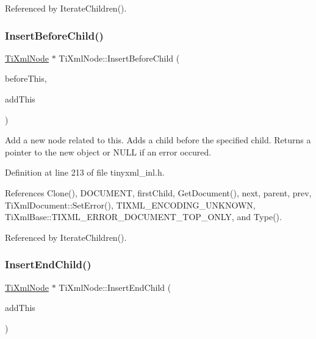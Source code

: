 Referenced by Iterate\+Children().

\hypertarget{class_ti_xml_node_a71e54e393336382bc9875f64aab5cb15}{}\label{class_ti_xml_node_a71e54e393336382bc9875f64aab5cb15} 
\subsubsection{\texorpdfstring{Insert\+Before\+Child()}{InsertBeforeChild()}}
{\footnotesize\ttfamily \hyperlink{class_ti_xml_node}{Ti\+Xml\+Node} $\ast$ Ti\+Xml\+Node\+::\+Insert\+Before\+Child (\begin{DoxyParamCaption}\item[{\hyperlink{class_ti_xml_node}{Ti\+Xml\+Node} $\ast$}]{before\+This,  }\item[{const \hyperlink{class_ti_xml_node}{Ti\+Xml\+Node} \&}]{add\+This }\end{DoxyParamCaption})}

Add a new node related to this. Adds a child before the specified child. Returns a pointer to the new object or N\+U\+LL if an error occured. 

Definition at line 213 of file tinyxml\+\_\+inl.\+h.



References Clone(), D\+O\+C\+U\+M\+E\+NT, first\+Child, Get\+Document(), next, parent, prev, Ti\+Xml\+Document\+::\+Set\+Error(), T\+I\+X\+M\+L\+\_\+\+E\+N\+C\+O\+D\+I\+N\+G\+\_\+\+U\+N\+K\+N\+O\+WN, Ti\+Xml\+Base\+::\+T\+I\+X\+M\+L\+\_\+\+E\+R\+R\+O\+R\+\_\+\+D\+O\+C\+U\+M\+E\+N\+T\+\_\+\+T\+O\+P\+\_\+\+O\+N\+LY, and Type().



Referenced by Iterate\+Children().

\hypertarget{class_ti_xml_node_af287a913ce46d8dbf7ef24fec69bbaf0}{}\label{class_ti_xml_node_af287a913ce46d8dbf7ef24fec69bbaf0} 
\subsubsection{\texorpdfstring{Insert\+End\+Child()}{InsertEndChild()}}
{\footnotesize\ttfamily \hyperlink{class_ti_xml_node}{Ti\+Xml\+Node} $\ast$ Ti\+Xml\+Node\+::\+Insert\+End\+Child (\begin{DoxyParamCaption}\item[{const \hyperlink{class_ti_xml_node}{Ti\+Xml\+Node} \&}]{add\+This }\end{DoxyParamCaption})}

